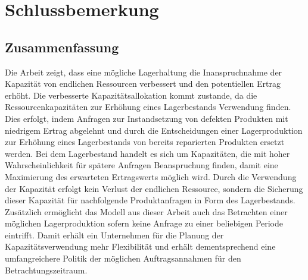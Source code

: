 \chapter{Schlussbemerkung}
\setcounter{footnote}{9}

\section*{Zusammenfassung}

Die Arbeit zeigt, dass eine mögliche Lagerhaltung die Inanspruchnahme der Kapazität von endlichen Ressourcen verbessert und den potentiellen Ertrag erhöht. Die verbesserte Kapazitätsallokation kommt zustande, da die Ressourcenkapazitäten zur Erhöhung eines Lagerbestands Verwendung finden. Dies erfolgt, indem Anfragen zur Instandsetzung von defekten Produkten mit niedrigem Ertrag abgelehnt und durch die Entscheidungen einer Lagerproduktion zur Erhöhung eines Lagerbestands von bereits reparierten Produkten ersetzt werden. Bei dem Lagerbestand handelt es sich um Kapazitäten, die mit hoher Wahrscheinlichkeit für spätere Anfragen Beanspruchung finden, damit eine Maximierung des erwarteten Ertragswerts möglich wird. Durch die Verwendung der Kapazität erfolgt kein Verlust der endlichen Ressource, sondern die Sicherung dieser Kapazität für nachfolgende Produktanfragen in Form des Lagerbestands. Zusätzlich ermöglicht das Modell aus dieser Arbeit auch das Betrachten einer möglichen Lagerproduktion sofern keine Anfrage zu einer beliebigen Periode eintrifft. Damit erhält ein Unternehmen für die Planung der Kapazitätsverwendung mehr Flexibilität und erhält dementsprechend eine umfangreichere Politik der möglichen Auftragsannahmen für den Betrachtungszeitraum.

